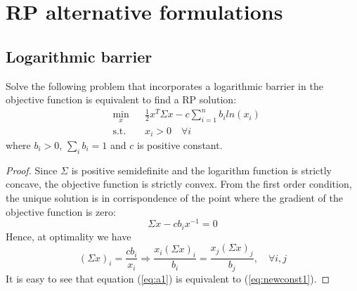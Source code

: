 \section{RP alternative formulations}
\subsection{Logarithmic barrier}\label{sec:rp}
\begin{theorem}
Solve the following problem that incorporates a logarithmic barrier in the objective function is equivalent to find a RP solution:
\begin{equation}\label{eq:log1}
\begin{aligned}
& \underset{x}{\text{min}}
&&\frac{1}{2} x^T \Sigma x - c \sum_{i=1}^{n} b_i ln(x_i)\\
& \text{s.t.}
&& x_i > 0 \hspace{1em} \forall i
\end{aligned}
\end{equation}
where $b_i > 0$, $\sum_i b_i = 1$ and $c$ is positive constant.
\end{theorem}
\begin{proof}
Since $\Sigma$ is positive semidefinite and the logarithm function is strictly concave, the objective function is strictly convex. From the first order condition, the unique solution is in corrispondence of the point where the gradient of the objective function is zero:
\begin{equation}
\Sigma x - c b_i x^{-1} = 0
\end{equation}
Hence, at optimality we have
\begin{equation}\label{eq:a1}
(\Sigma x)_i = \frac{c b_i}{x_i} \Rightarrow \frac{x_i(\Sigma x)_i}{b_i} = \frac{x_j(\Sigma x)_j}{b_j}, \quad \forall i,j
\end{equation}
It is easy to see that equation (\ref{eq:a1}) is equivalent to (\ref{eq:newconst1}). 
\end{proof}
